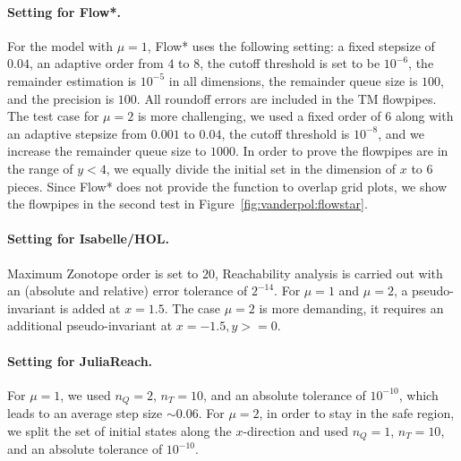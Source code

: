 \documentclass[EPiC]{easychair}
\begin{document}
\paragraph{Setting for Flow*.}
For the model with $\mu = 1$, Flow* uses the following setting: a fixed stepsize of $0.04$, an adaptive order from $4$ to $8$, the cutoff threshold is set to be $10^{-6}$, the remainder estimation is $10^{-5}$ in all dimensions, the remainder queue size is $100$, and the precision is $100$. All roundoff errors are included in the TM flowpipes. The test case for $\mu = 2$ is more challenging, we used a fixed order of $6$ along with an adaptive stepsize from $0.001$ to $0.04$, the cutoff threshold is $10^{-8}$, and we increase the remainder queue size to $1000$. In order to prove the flowpipes are in the range of $y < 4$, we equally divide the initial set in the dimension of $x$ to $6$ pieces. Since Flow* does not provide the function to overlap grid plots, we show the flowpipes in the second test in Figure~\ref{fig:vanderpol:flowstar}.



\paragraph{Setting for Isabelle/HOL.}
Maximum Zonotope order is set to $20$, Reachability analysis is carried out with an (absolute and relative) error tolerance of $2^{-14}$. For $\mu = 1$ and $\mu = 2$, a pseudo-invariant is added at $x=1.5$. The case $\mu = 2$ is more demanding, it requires an additional pseudo-invariant  at $x = -1.5, y >= 0$.

\paragraph{Setting for JuliaReach.} For $\mu=1$, we used $n_Q=2$, $n_T=10$, and an absolute tolerance of $10^{-10}$, which leads to an average step size $\sim 0.06$. For $\mu=2$, in order to stay in the safe region, we split the set of initial states along the $x$-direction and used $n_Q=1$, $n_T=10$, and an absolute tolerance of $10^{-10}$.
\end{document}
